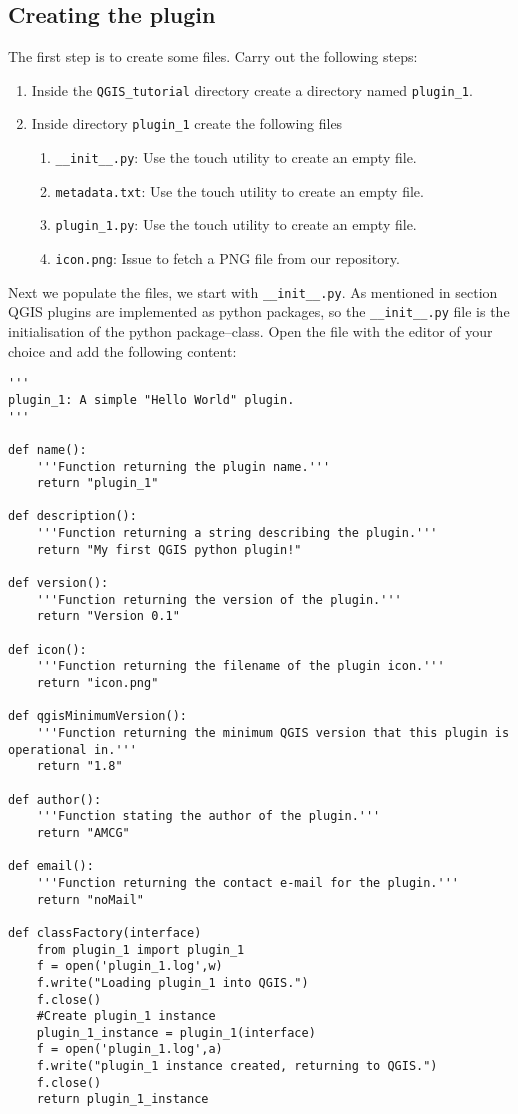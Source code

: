 \subsection{Creating the plugin}
\label{ssect:creating_plugin_1}
\par %
The first step is to create some files. Carry out the following steps:
\begin{enumerate}
  \item Inside the \lstinline{QGIS_tutorial} directory create a directory named \lstinline{plugin_1}.
  \item Inside directory \lstinline{plugin_1} create the following files
  \begin{enumerate}
    \item \lstinline{__init__.py}: Use the touch utility to create an empty file.
    \item \lstinline{metadata.txt}: Use the touch utility to create an empty file.
    \item \lstinline{plugin_1.py}: Use the touch utility to create an empty file.
    \item \lstinline{icon.png}: Issue \lstinline{} to fetch a PNG file from our repository.
  \end{enumerate}
\end{enumerate}
Next we populate the files, we start with \lstinline{__init__.py}. As mentioned in section \label{sect:introduction} QGIS plugins are implemented as python packages, so the \lstinline{__init__.py} file is the initialisation of the python package--class. Open the file with the editor of your choice and add the following content:
\begin{lstlisting}
'''
plugin_1: A simple "Hello World" plugin.
'''

def name():
    '''Function returning the plugin name.'''
    return "plugin_1"

def description():
    '''Function returning a string describing the plugin.'''
    return "My first QGIS python plugin!"

def version():
    '''Function returning the version of the plugin.'''
    return "Version 0.1"

def icon():
    '''Function returning the filename of the plugin icon.'''
    return "icon.png"

def qgisMinimumVersion():
    '''Function returning the minimum QGIS version that this plugin is operational in.'''
    return "1.8"

def author():
    '''Function stating the author of the plugin.'''
    return "AMCG"

def email():
    '''Function returning the contact e-mail for the plugin.'''
    return "noMail"

def classFactory(interface)
    from plugin_1 import plugin_1
    f = open('plugin_1.log',w)
    f.write("Loading plugin_1 into QGIS.")
    f.close()
    #Create plugin_1 instance
    plugin_1_instance = plugin_1(interface)
    f = open('plugin_1.log',a)
    f.write("plugin_1 instance created, returning to QGIS.")
    f.close()
    return plugin_1_instance
\end{lstlisting}

